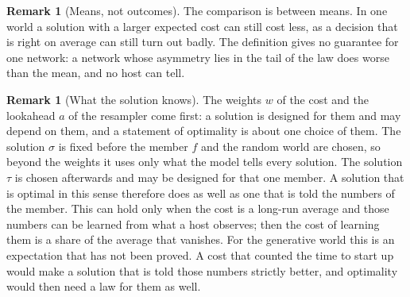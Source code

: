 \documentclass[11pt,a4paper]{article}
\theoremstyle{definition}
\newtheorem{remark}[definition]{Remark}
\begin{document}
\begin{remark}[Means, not outcomes]
The comparison is between means. In one world a solution with a larger
expected cost can still cost less, as a decision that is right on average
can still turn out badly. The definition gives no guarantee for one
network: a network whose asymmetry lies in the tail of the law does worse
than the mean, and no host can tell.
\end{remark}

\begin{remark}[What the solution knows]
The weights $w$ of the cost and the lookahead $a$ of the resampler come
first: a solution is designed for them and may depend on them, and a
statement of optimality is about one choice of them. The solution $\sigma$
is fixed before the member $f$ and the random world are chosen, so beyond
the weights it uses only what the model tells every solution. The
solution $\tau$ is chosen afterwards and may be designed for that one
member. A solution that is optimal in this sense therefore does as well as
one that is told the numbers of the member. This can hold only when the cost is a
long-run average and those numbers can be learned from what a host
observes; then the cost of learning them is a share of the average that
vanishes. For the generative world this is an expectation that has not been
proved. A cost that counted the time to start up would make a solution that
is told those numbers strictly better, and optimality would then need a
law for them as well.
\end{remark}
\end{document}
